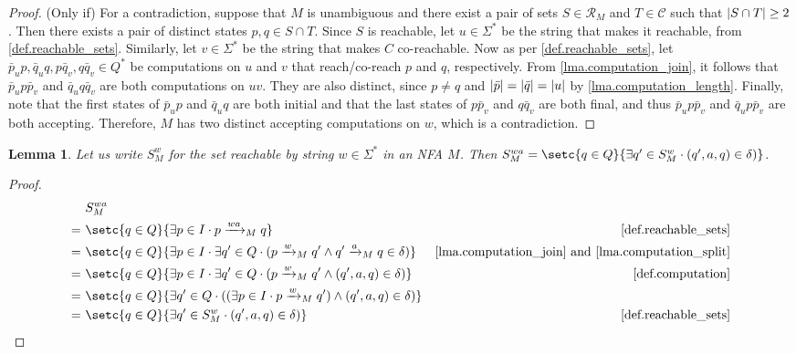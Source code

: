 \documentclass{report}
\DeclarePairedDelimiter{\abs}{\lvert}{\rvert}
\newtheorem{lemma}[theorem]{Lemma}
\theoremstyle{definition}
\begin{document}
\begin{appendices}
\begin{proof}
(Only if) For a contradiction, suppose that $M$ is unambiguous and there exist
a pair of sets $S \in \mathcal{R}_M$ and $T \in \mathcal{C}$ such that
$\abs{S \cap T} \geq 2$. Then there exists a pair of distinct states
$p, q \in S \cap T$.
Since $S$ is reachable, let $u \in \Sigma^{\ast}$ be the string that makes
it reachable, from \cref{def.reachable_sets}. Similarly, let $v \in \Sigma^{\ast}$
be the string that makes $C$ co-reachable. Now as per \cref{def.reachable_sets},
let $\bar{p}_u p, \bar{q}_u q, p \bar{q}_v, q \bar{q}_v \in Q^{\ast}$ be
computations on $u$ and $v$ that reach/co-reach $p$ and $q$, respectively. From
\cref{lma.computation_join}, it follows that $\bar{p}_u p \bar{p}_v$
and $\bar{q}_u q \bar{q}_v$ are both computations on $uv$. They are also distinct,
since $p \neq q$ and $\abs{\bar{p}} = \abs{\bar{q}} = \abs{u}$ by
\cref{lma.computation_length}. Finally, note that the first states of $\bar{p}_u p$
and $\bar{q}_u q$ are both initial and that the last states of $p \bar{p}_v$ and
$q \bar{q}_v$ are both final, and thus $\bar{p}_u p \bar{p}_v$ and
$\bar{q}_u p \bar{p}_v$ are both accepting. Therefore, $M$ has two distinct
accepting computations on $w$, which is a contradiction.
\end{proof}

\begin{lemma} \label{lma.reachable_alternative}
Let us write $S^w_M$ for the set reachable by string
$w \in \Sigma^{\ast}$ in an NFA $M$. Then
$S^{wa}_M = \setc{q \in Q}{\exists q' \in S^w_M \cdot (q', a, q) \in \delta)}$.
\end{lemma}

\begin{proof}
\begin{align*}
& S^{wa}_M \\
= \ & \setc{q \in Q}{\exists p \in I \cdot p \xrightarrow{wa}_M q}
& \text{\cref{def.reachable_sets}} \\
= \ & \setc{q \in Q}{\exists p \in I \cdot \exists q' \in Q \cdot
(p \xrightarrow{w}_M q' \wedge q' \xrightarrow{a}_M q \in \delta)}
& \text{\cref{lma.computation_join} and \cref{lma.computation_split}} \\
= \ & \setc{q \in Q}{\exists p \in I \cdot \exists q' \in Q \cdot
(p \xrightarrow{w}_M q' \wedge (q', a, q) \in \delta)}
& \text{\cref{def.computation}} \\
= \ & \setc{q \in Q}{\exists q' \in Q \cdot ((\exists p \in I \cdot
p \xrightarrow{w}_M q') \wedge (q', a, q) \in \delta)} \\
= \ & \setc{q \in Q}{\exists q' \in S^w_M \cdot (q', a, q) \in \delta)}
& \text{\cref{def.reachable_sets}} \\
\end{align*}
\end{proof}


\end{appendices}
\end{document}
